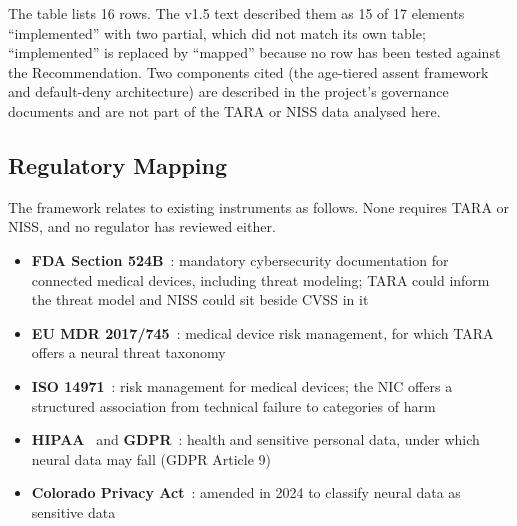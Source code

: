 \noindent The table lists 16 rows. The v1.5 text described them as 15 of 17 elements
``implemented'' with two partial, which did not match its own table; ``implemented'' is
replaced by ``mapped'' because no row has been tested against the Recommendation. Two
components cited (the age-tiered assent framework and default-deny architecture) are
described in the project's governance documents and are not part of the TARA or NISS data
analysed here.

\subsection{Regulatory Mapping}

The framework relates to existing instruments as follows. None requires TARA or NISS, and
no regulator has reviewed either.

\begin{itemize}
  \item \textbf{FDA Section 524B}~\cite{fda524b}: mandatory cybersecurity documentation
        for connected medical devices, including threat modeling; TARA could inform the
        threat model and NISS could sit beside CVSS in it
  \item \textbf{EU MDR 2017/745}~\cite{eumdr2017}: medical device risk management, for
        which TARA offers a neural threat taxonomy
  \item \textbf{ISO 14971}~\cite{iso14971}: risk management for medical devices; the NIC
        offers a structured association from technical failure to categories of harm
  \item \textbf{HIPAA}~\cite{hipaa1996} and \textbf{GDPR}~\cite{gdpr2016}: health and
        sensitive personal data, under which neural data may fall (GDPR Article 9)
  \item \textbf{Colorado Privacy Act}~\cite{colorado2024neuraldata}: amended in 2024 to
        classify neural data as sensitive data
\end{itemize}
